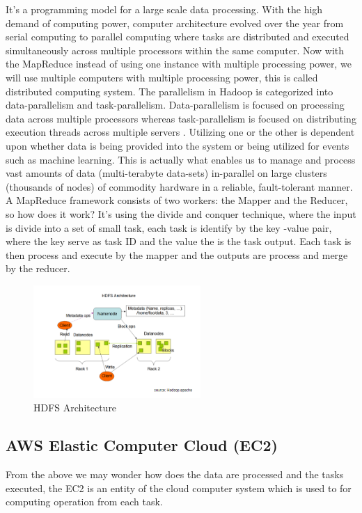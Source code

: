 \documentclass[journal]{IEEEtran}
\begin{document}
It’s a programming model for a large scale data processing. With the high demand of computing power, computer architecture evolved over the year from serial computing to parallel computing where tasks are distributed and executed simultaneously across multiple processors within the same computer. Now with the MapReduce instead of using one instance with multiple processing power, we will use multiple computers with multiple processing power, this is called distributed computing system. The parallelism in Hadoop is categorized into data-parallelism and task-parallelism. Data-parallelism is focused on processing data across multiple processors whereas task-parallelism is focused on distributing execution threads across multiple servers \cite{Parallelism}. Utilizing one or the other is dependent upon whether data is being provided into the system or being utilized for events such as machine learning. This is actually what enables us to manage and process vast amounts of data (multi-terabyte data-sets) in-parallel on large clusters (thousands of nodes) of commodity hardware in a reliable, fault-tolerant manner. A MapReduce framework consists of two workers: the Mapper and the Reducer, so how does it work? It's using the divide and conquer technique, where the input is divide into a set of small task, each task is identify by the key -value pair, where the key serve as task ID and the value the is the task output. Each task is then process and execute by the mapper and the outputs are process and merge by the reducer.

\begin{figure}
	\centering
	\includegraphics[width=2.5in]{HDFS_Arch.png}
	\caption{HDFS Architecture}
	\label{HDFS}
\end{figure}

\subsection{AWS Elastic Computer Cloud (EC2)}

From the above we may wonder how does the data are processed and the tasks executed, the EC2 is an entity of the cloud computer system which is used to for computing operation from each task.
\end{document}
